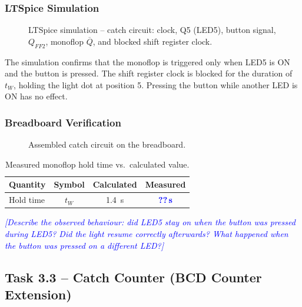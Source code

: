 \documentclass[12pt, a4paper]{article}
\newcommand{\val}[1]{\textcolor{blue}{\textbf{??\,\si{#1}}}}
\newcommand{\enter}[1]{\textcolor{blue}{\textit{[#1]}}}
\begin{document}
\subsubsection{LTSpice Simulation}

\begin{figure}[H]
  \centering
  \caption{LTSpice simulation -- catch circuit: clock, Q5 (LED5), button signal,
           $Q_{FF2}$, monoflop $\overline{Q}$, and blocked shift register clock.}
  \label{fig:sim_catch}
\end{figure}

The simulation confirms that the monoflop is triggered only when LED5 is ON and the
button is pressed. The shift register clock is blocked for the duration of $t_W$,
holding the light dot at position 5. Pressing the button while another LED is ON
has no effect.

\subsubsection{Breadboard Verification}

\begin{figure}[H]
  \centering
  \caption{Assembled catch circuit on the breadboard.}
  \label{fig:board_catch}
\end{figure}

\begin{table}[H]
  \centering
  \caption{Measured monoflop hold time vs.\ calculated value.}
  \label{tab:monoflop}
  \begin{tabular}{lccc}
    \toprule
    Quantity & Symbol & Calculated & Measured \\
    \midrule
    Hold time & $t_W$ & \SI{1.4}{\second} & \val{\second} \\
    \bottomrule
  \end{tabular}
\end{table}

\enter{Describe the observed behaviour: did LED5 stay on when the button was pressed
during LED5? Did the light resume correctly afterwards? What happened when the button
was pressed on a different LED?}

\subsection{Task 3.3 -- Catch Counter (BCD Counter Extension)}
\end{document}
